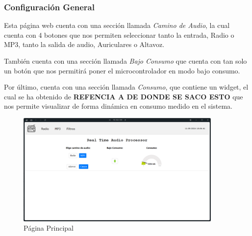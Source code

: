 \subsubsection{Configuración General}
Esta página web cuenta con una sección llamada \textit{Camino de Audio}, la cual cuenta con 4 botones que nos permiten seleccionar tanto la entrada, Radio o MP3, tanto la salida de audio, Auriculares o Altavoz.

También cuenta con una sección llamada \textit{Bajo Consumo} que cuenta con tan solo un botón que nos permitirá poner el microcontrolador en modo bajo consumo.

Por último, cuenta con una sección llamada \textit{Consumo}, que contiene un widget, el cual se ha obtenido de \textbf{REFENCIA A DE DONDE SE SACO ESTO} que nos permite visualizar de forma dinámica en consumo medido en el sistema. %

\begin{figure}[h]
    \centering
    \includegraphics[width=0.9\textwidth]{images/3/3-1/3-1-1-1/Pagina_Principal.png}
    \caption{Página Principal}
    \label{fig:3-1-1-1-Principal}
\end{figure}